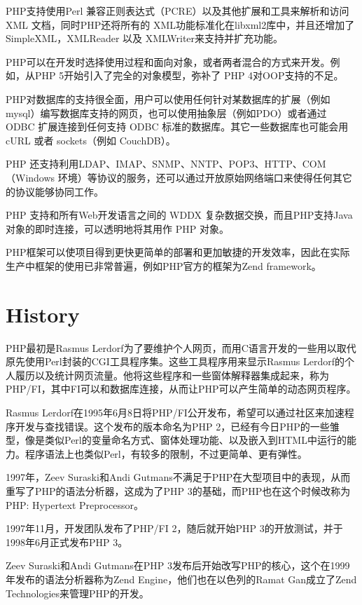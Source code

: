 PHP支持使用Perl 兼容正则表达式（PCRE）以及其他扩展和工具来解析和访问 XML 文档，同时PHP还将所有的 XML功能标准化在libxml2库中，并且还增加了 SimpleXML，XMLReader 以及 XMLWriter来支持并扩充功能。


PHP可以在开发时选择使用过程和面向对象，或者两者混合的方式来开发。例如，从PHP 5开始引入了完全的对象模型，弥补了 PHP 4对OOP支持的不足。

PHP对数据库的支持很全面，用户可以使用任何针对某数据库的扩展（例如 mysql）编写数据库支持的网页，也可以使用抽象层（例如PDO）或者通过 ODBC 扩展连接到任何支持 ODBC 标准的数据库。其它一些数据库也可能会用 cURL 或者 sockets（例如 CouchDB）。



PHP 还支持利用LDAP、IMAP、SNMP、NNTP、POP3、HTTP、COM（Windows 环境）等协议的服务，还可以通过开放原始网络端口来使得任何其它的协议能够协同工作。

PHP 支持和所有Web开发语言之间的 WDDX 复杂数据交换，而且PHP支持Java 对象的即时连接，可以透明地将其用作 PHP 对象。


PHP框架可以使项目得到更快更简单的部署和更加敏捷的开发效率，因此在实际生产中框架的使用已非常普遍，例如PHP官方的框架为Zend framework。





\section{History}




PHP最初是Rasmus Lerdorf为了要维护个人网页，而用C语言开发的一些用以取代原先使用Perl封装的CGI工具程序集。这些工具程序用来显示Rasmus Lerdorf的个人履历以及统计网页流量。他将这些程序和一些窗体解释器集成起来，称为PHP/FI，其中FI可以和数据库连接，从而让PHP可以产生简单的动态网页程序。

Rasmus Lerdorf在1995年6月8日将PHP/FI公开发布，希望可以通过社区来加速程序开发与查找错误。这个发布的版本命名为PHP 2，已经有今日PHP的一些雏型，像是类似Perl的变量命名方式、窗体处理功能、以及嵌入到HTML中运行的能力。程序语法上也类似Perl，有较多的限制，不过更简单、更有弹性。

1997年，Zeev Suraski和Andi Gutmans不满足于PHP在大型项目中的表现，从而重写了PHP的语法分析器，这成为了PHP 3的基础，而PHP也在这个时候改称为PHP: Hypertext Preprocessor。

1997年11月，开发团队发布了PHP/FI 2，随后就开始PHP 3的开放测试，并于1998年6月正式发布PHP 3。

Zeev Suraski和Andi Gutmans在PHP 3发布后开始改写PHP的核心，这个在1999年发布的语法分析器称为Zend Engine，他们也在以色列的Ramat Gan成立了Zend Technologies来管理PHP的开发。

